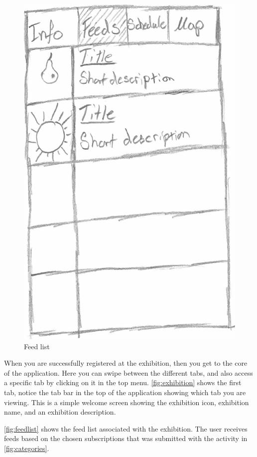 \begin{figure}[H]
\begin{minipage}[b]{0.5\columnwidth}
\includegraphics[width=0.7\columnwidth]{img/prototype/4.png}
\caption{Feed list\label{fig:feedlist}}
\end{minipage}
\end{figure}

When you are successfully registered at the exhibition, then you get to the core of the application. Here you can swipe between the different tabs, and also access a specific tab by clicking on it in the top menu. \autoref{fig:exhibition} shows the first tab, notice the tab bar in the top of the application showing which tab you are viewing. This is a simple welcome screen showing the exhibition icon, exhibition name, and an exhibition description.

\autoref{fig:feedlist} shows the feed list associated with the exhibition. The user receives feeds based on the chosen subscriptions that was submitted with the activity in \autoref{fig:categories}.

